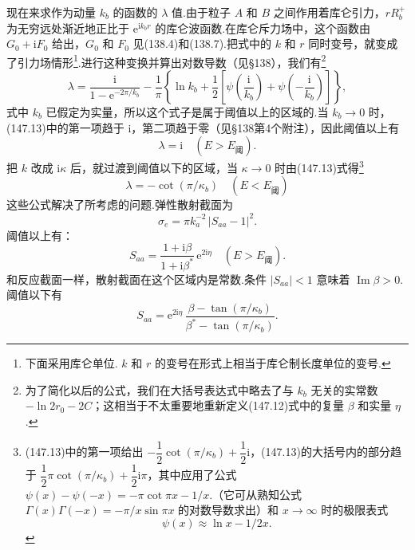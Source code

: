 现在来求作为动量 $k_b$ 的函数的 $\lambda$ 值.由于粒子 $A$ 和 $B$ 之间作用着库仑引力，$rR_b^{+}$ 为无穷远处渐近地正比于 $\mathrm{e}^{\mathrm{i}k_br}$ 的库仑波函数.在库仑斥力场中，这个函数由 $G_0+\mathrm{i}F_0$ 给出，$G_0$ 和 $F_0$ 见(138.4)和(138.7).把式中的 $k$ 和 $r$ 同时变号，就变成了引力场情形\footnote{下面采用库仑单位. $k$ 和 $r$ 的变号在形式上相当于库仑制长度单位的变号.}.进行这种变换并算出对数导数（见§138），我们有\footnote{为了简化以后的公式，我们在大括号表达式中略去了与 $k_b$ 无关的实常数 $-\ln2r_0-2C$；这相当于不太重要地重新定义(147.12)式中的复量 $\beta$ 和实量 $\eta$.}
\begin{equation}
  \lambda=\frac{\mathrm{i}}{1-\mathrm{e}^{-2\pi/k_b}}
  -\frac{1}{\pi}\left\{\ln k_b+\frac{1}{2}\left[\psi\left(\frac{\mathrm{i}}{k_b}\right)
  +\psi\left(-\frac{\mathrm{i}}{k_b}\right)\right]\right\},
\end{equation}
式中 $k_b$ 已假定为实量，所以这个式子是属于阈值以上的区域的.当 $k_b\to0$ 时，(147.13)中的第一项趋于 $\mathrm{i}$，第二项趋于零（见§138第4个附注），因此阈值以上有
\begin{equation}
  \lambda=\mathrm{i}\quad\left(E>E_{\text{阈}}\right).
\end{equation}
把 $k$ 改成 $\mathrm{i}\kappa$ 后，就过渡到阈值以下的区域，当 $\kappa\to0$ 时由(147.13)式得\footnote{(147.13)中的第一项给出 $-\dfrac{1}{2}\cot(\pi/\kappa_b)+\dfrac{1}{2}\mathrm{i}$，(147.13)的大括号内的部分趋于 $\dfrac{1}{2}\pi\cot(\pi/\kappa_b)+\dfrac{1}{2}\mathrm{i}\pi$，其中应用了公式 $\psi(x)-\psi(-x)=-\pi\cot\pi x-1/x$.（它可从熟知公式 $\Gamma(x)\Gamma(-x)=-\pi/x\sin\pi x$ 的对数导数求出）和 $x\to\infty$ 时的极限表式
\begin{equation*}
  \psi(x)\approx\ln x-1/2x.
\end{equation*}}
\begin{equation}
  \lambda=-\cot(\pi/\kappa_b)\quad\left(E<E_{\text{阈}}\right)
\end{equation}
这些公式解决了所考虑的问题.弹性散射截面为
\begin{equation*}
  \sigma_e=\pi k_a^{-2}\,|S_{aa}-1|^2.
\end{equation*}
阈值以上有：
\begin{equation}
  S_{aa}=\frac{1+\mathrm{i}\beta}{1+\mathrm{i}\beta^{*}}\,\mathrm{e}^{2\mathrm{i}\eta}
  \quad\left(E>E_{\text{阈}}\right).
\end{equation}
和反应截面一样，散射截面在这个区域内是常数.条件 $|S_{aa}|<1$ 意味着 $\operatorname{Im}\beta>0$.阈值以下有
\begin{equation}
  S_{aa}=\mathrm{e}^{2\mathrm{i}\eta}\,
  \frac{\beta-\tan(\pi/\kappa_b)}{\beta^{*}-\tan(\pi/\kappa_b)}.
\end{equation}
